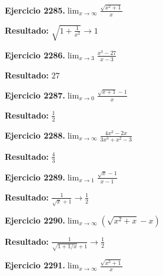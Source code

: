 \documentclass[10pt,a4paper]{article}
\begin{document}
\newpage
\begin{ejbox}
\textbf{Ejercicio 2285.}\quad $\lim_{x\to \infty} \frac{\sqrt{x^2+1}}{x}$
\end{ejbox}

\begin{solbox}
\textbf{Resultado:} \(\displaystyle \sqrt{1+\frac{1}{x^2}} \to 1\)
\end{solbox}

\begin{ejbox}
\textbf{Ejercicio 2286.}\quad $\lim_{x\to 3} \frac{x^3-27}{x-3}$
\end{ejbox}

\begin{solbox}
\textbf{Resultado:} \(\displaystyle 27\)
\end{solbox}

\begin{ejbox}
\textbf{Ejercicio 2287.}\quad $\lim_{x\to 0} \frac{\sqrt{x+1}-1}{x}$
\end{ejbox}

\begin{solbox}
\textbf{Resultado:} \(\displaystyle \frac{1}{2}\)
\end{solbox}

\newpage
\begin{ejbox}
\textbf{Ejercicio 2288.}\quad $\lim_{x\to \infty} \frac{4x^3 - 2x}{3x^3 + x^2 - 3}$
\end{ejbox}

\begin{solbox}
\textbf{Resultado:} \(\displaystyle \frac{4}{3}\)
\end{solbox}

\begin{ejbox}
\textbf{Ejercicio 2289.}\quad $\lim_{x\to 1} \frac{\sqrt{x}-1}{x-1}$
\end{ejbox}

\begin{solbox}
\textbf{Resultado:} \(\displaystyle \frac{1}{\sqrt{x}+1} \to \frac{1}{2}\)
\end{solbox}

\begin{ejbox}
\textbf{Ejercicio 2290.}\quad $\lim_{x\to \infty} (\sqrt{x^2+x} - x)$
\end{ejbox}

\begin{solbox}
\textbf{Resultado:} \(\displaystyle \frac{1}{\sqrt{1+1/x}+1} \to \frac{1}{2}\)
\end{solbox}

\newpage
\begin{ejbox}
\textbf{Ejercicio 2291.}\quad $\lim_{x\to \infty} \frac{\sqrt{x^2+1}}{x}$
\end{ejbox}
\end{document}
